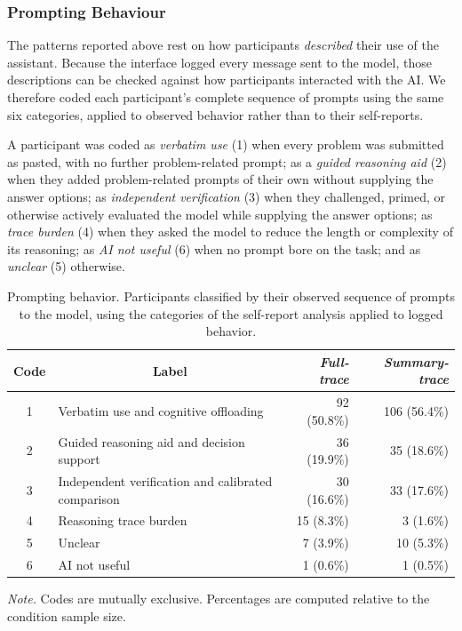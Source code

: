 \documentclass[manuscript,review,anonymous]{acmart}
\begin{document}
\subsubsection{Prompting Behaviour}\label{sec:prompting_behaviour}

The patterns reported above rest on how participants \emph{described} their use of
the assistant. Because the interface logged every message sent to the model, those
descriptions can be checked against how participants interacted with the AI. We therefore coded each participant's complete sequence of prompts using the same six
categories, applied to observed behavior rather than to their self-reports.

A participant was coded as \textit{verbatim use} (1) when every problem was
submitted as pasted, with no further problem-related prompt; as a \textit{guided
reasoning aid} (2) when they added problem-related prompts of their own without
supplying the answer options; as \textit{independent verification} (3) when they
challenged, primed, or otherwise actively evaluated the model while supplying the
answer options; as \textit{trace burden} (4) when they asked the model to reduce
the length or complexity of its reasoning; as \textit{AI not useful} (6) when no
prompt bore on the task; and as \textit{unclear} (5) otherwise.

\begin{table}[H]
\centering
\caption{Prompting behavior. Participants classified by their observed sequence
of prompts to the model, using the categories of the self-report analysis applied
to logged behavior.}
\label{tab:prompting_behaviour}
\begin{tabular}{clrr}
\hline
Code & \multicolumn{1}{c}{Label} & \textit{Full-trace} & \textit{Summary-trace} \\
\hline
1 & Verbatim use and cognitive offloading              & 92 (50.8\%) & 106 (56.4\%) \\
2 & Guided reasoning aid and decision support          & 36 (19.9\%) & 35 (18.6\%)  \\
3 & Independent verification and calibrated comparison & 30 (16.6\%) & 33 (17.6\%)  \\
4 & Reasoning trace burden                             & 15 (8.3\%)  & 3 (1.6\%)    \\
5 & Unclear                                            & 7 (3.9\%)   & 10 (5.3\%)   \\
6 & AI not useful                                      & 1 (0.6\%)   & 1 (0.5\%)    \\
\hline
\end{tabular}

\raggedright \small \textit{Note.} Codes are mutually exclusive. Percentages are computed relative to the condition sample size.
\end{table}
\end{document}
